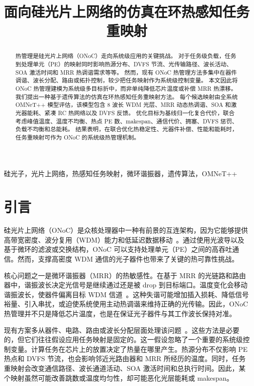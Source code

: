 \documentclass[conference]{IEEEtran}
\begin{document}
\title{面向硅光片上网络的仿真在环热感知任务重映射}

\author{}

\maketitle

\begin{abstract}
热管理是硅光片上网络（ONoC）走向系统级应用的关键挑战。
对于任务级负载，任务到处理单元（PE）的映射同时影响热源分布、DVFS 节流、光传输路径、波长活动、SOA 激活时间和 MRR 热调谐需求等等。
然而，现有 ONoC 热管理方法多集中在器件调谐、波长分配、路由或拓扑控制，较少把任务映射作为系统级控制变量。
本文因此将 ONoC 热管理建模为系统级多目标折中，而非单纯降低芯片温度或补偿 MRR 热漂移。
我们提出一种基于遗传算法的仿真在环热感知任务重映射方法。
每个候选映射由全系统 OMNeT++ 模型评估，该模型包含 8 波长 WDM 光层、MRR 动态热调谐、SOA 和激光器能耗、紧凑 RC 热网络以及 DVFS 反馈。
优化目标为基线归一化复合代价，联合考虑峰值温度、温度不均衡、热点 PE 数、makespan、通信代价、拥塞、DVFS 惩罚、负载不均衡和总能耗。
结果表明，在联合优化热稳定性、光器件补偿、性能和能耗时，任务重映射可作为 ONoC 的系统级热管理机制。
\end{abstract}

\begin{IEEEkeywords}
硅光子，光片上网络，热感知任务映射，微环谐振器，遗传算法，OMNeT++
\end{IEEEkeywords}

\section{引言}

硅光片上网络（ONoC）是众核处理器中一种有前景的互连架构，因为它能够提供高带宽密度、波分复用（WDM）能力和低延迟数据移动~\cite{batten2008,bergman2018}。通过使用光波导以及基于微环的滤波或交换结构，ONoC 可以支持处理单元（PE）之间的高吞吐通信。然而，支撑高密度 WDM 通信的光子器件也带来了关键的热可靠性挑战。

核心问题之一是微环谐振器（MRR）的热敏感性。在基于 MRR 的光链路和路由器中，谐振波长决定光信号是继续通过还是被 drop 到目标端口。温度变化会移动谐振波长，使器件偏离目标 WDM 信道~\cite{padmaraju2014}。这种失谐可能增加插入损耗、降低信号裕量、引入串扰，或迫使系统使用主动热调谐来维持正确的光传输。因此，ONoC 热管理并不只是降低芯片温度，也是在保证光子器件与其工作波长保持对准。

现有方案多从器件、电路、路由或波长分配层面处理该问题~\cite{guha2012,zhou2013,chittamuru2015}。这些方法是必要的，但它们往往假设应用任务映射是固定的。这一假设忽略了一个重要的系统级控制变量。计算任务在芯片上的放置决定了热量在哪里产生。热源分布不仅影响 PE 热点和 DVFS 节流，也会影响邻近光路由器和 MRR 所经历的温度。同时，任务重映射会改变通信路径、波长通道活动、SOA 激活时间和总执行时间。因此，某个映射虽然可能改善跳数或温度均匀性，却可能恶化光层能耗或 makespan。
\end{document}
